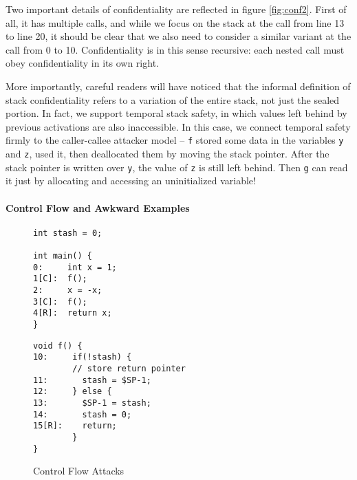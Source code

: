 \documentclass[acmsmall,review,anonymous]{acmart}\settopmatter{printfolios=true,printccs=false,printacmref=false}
\begin{document}
Two important details of confidentiality are reflected in figure \ref{fig:conf2}.
First of all, it has multiple calls, and while we focus on the stack at the call
from line 13 to line 20, it should be clear that we also need to consider a similar
variant at the call from 0 to 10. Confidentiality is in this sense recursive: each
nested call must obey confidentiality in its own right.

More importantly, careful readers will have noticed that the informal definition
of stack confidentiality refers to a variation of the entire stack, not just the
sealed portion. In fact, we support temporal stack safety, in which values left behind
by previous activations are also inaccessible. In this case, we connect temporal safety
firmly to the caller-callee attacker model -- {\tt f} stored some data in the variables
{\tt y} and {\tt z}, used it, then deallocated them by moving the stack pointer.
After the stack pointer is written over {\tt y}, the value of {\tt z} is still
left behind. Then {\tt g} can read it just by allocating and accessing an uninitialized
variable! 

\paragraph*{Control Flow and Awkward Examples}

\begin{figure}
  \centering
  \begin{minipage}{.4\textwidth}
\begin{verbatim}
int stash = 0;

int main() {
0:     int x = 1;
1[C]:  f();
2:     x = -x;
3[C]:  f();
4[R]:  return x;
}
\end{verbatim}
  \end{minipage}
  \begin{minipage}{.4\textwidth}
\begin{verbatim}
void f() {
10:     if(!stash) {
        // store return pointer
11:       stash = $SP-1;
12:     } else {
13:       $SP-1 = stash;
14:       stash = 0;
15[R]:    return;
        }
}
\end{verbatim}
  \end{minipage}
\label{fig:WBCF1}
%
%
  \caption{Control Flow Attacks}
  \label{fig:WBCF}
\end{figure}
\end{document}
